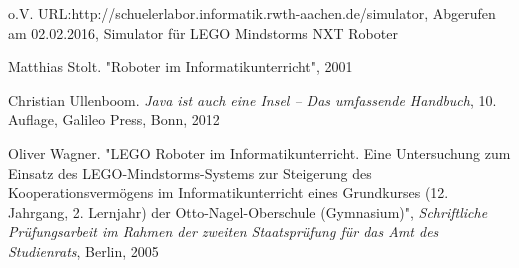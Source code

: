 \begin{thebibliography}{ABCDEF}
o.V. URL:{http://schuelerlabor.informatik.rwth-aachen.de/simulator}, Abgerufen am 02.02.2016, Simulator für LEGO Mindstorms NXT Roboter

Matthias Stolt. "Roboter im Informatikunterricht", 2001

Christian Ullenboom. \emph{Java ist auch eine Insel -- Das umfassende Handbuch}, 10. Auflage, Galileo Press, Bonn, 2012

Oliver Wagner. "LEGO Roboter im Informatikunterricht. Eine Untersuchung zum Einsatz des LEGO-Mindstorms-Systems zur Steigerung des Kooperationsvermögens im Informatikunterricht eines Grundkurses (12. Jahrgang, 2. Lernjahr) der Otto-Nagel-Oberschule (Gymnasium)", \emph{Schriftliche Prüfungsarbeit im Rahmen der zweiten Staatsprüfung für das Amt des Studienrats}, Berlin, 2005

\end{thebibliography}